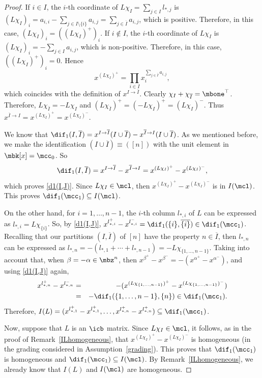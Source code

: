 \begin{proof}
If $i\in I$, the $i$-th coordinate of $L\chi_I=\sum_{j\in I}l_{*,j}$
is $(L\chi_I)_i=a_{i,i}-\sum_{j\in
  I\setminus\{i\}}a_{i,j}=\sum_{j\in\overline{I}}a_{i,j}$, which is
positive. Therefore, in this case, $(L\chi_I)_i=((L\chi_I)^+)_i$.  If
$i\not\in I$, the $i$-th coordinate of $L\chi_I$ is
$(L\chi_I)_i=-\sum_{j\in I}a_{i,j}$, which is non-positive. Therefore,
in this case, $((L\chi_I)^+)_i=0$. Hence
\[
x^{(L\chi_I)^{+}}=\prod_{i\in
  I}x_i^{\sum_{j\in\overline{I}}a_{i,j}},
\]
which coincides with the
definition of $x^{I\to\overline{I}}$. Clearly
$\chi_I+\chi_{\overline{I}}=\mbone^{\top}$. Therefore,
$L\chi_{\overline{I}}=-L\chi_I$ and
$(L\chi_{\overline{I}})^+=(-L\chi_I)^+=(L\chi_I)^-$. Thus
$x^{\overline{I}\to I}=x^{(L\chi_{\overline{I}})^+}=x^{(L\chi_I)^-}$.

We know that $\dif_1(I,\overline{I})=x^{I\to \overline{I}}(I\cup
\overline{I})-x^{\overline{I}\to I}(I\cup \overline{I})$. As we
mentioned before, we make the identification $(I\cup
\overline{I})\equiv ([n])$ with the unit element in $\mbk[x]=\mcc_0$. So
\begin{eqnarray*}
\dif_1(I,\overline{I})=x^{I\to \overline{I}}-x^{\overline{I}\to
  I}=x^{(L\chi_I)^+}-x^{(L\chi_I)^-}, 
\end{eqnarray*}
which proves \eqref{d1(I,J)}. Since $L\chi_I\in\mcl$, then
$x^{(L\chi_I)^+}-x^{(L\chi_I)^-}$ is in $I(\mcl)$. This proves
$\dif_1(\mcc_1)\subseteq I(\mcl)$.

On the other hand, for $i=1,\ldots, n-1$, the $i$-th column $l_{*,i}$
of $L$ can be expressed as $l_{*,i}=L\chi_{\{i\}}$.  So, by
\eqref{d1(I,J)},
$x^{l_{*,i}^+}-x^{l_{*,i}^-}=\dif_1(\{i\},\overline{\{i\}})\in
\dif_1(\mcc_1)$.  Recalling that our partitions $(I,\overline{I})$ of
$[n]$ have the property $n\in \overline{I}$, then $l_{*,n}$ can be
expressed as $l_{*,n}=-(l_{*,1}+\cdots +l_{*,n-1})=-L\chi_{\{1,\ldots
  ,n-1\}}$. Taking into account that, when $\beta=-\alpha\in\mbz^n$,
then $x^{\beta^+}-x^{\beta^-}=-(x^{\alpha^+}-x^{\alpha^-})$, and using
\eqref{d1(I,J)} again,
\begin{eqnarray*}
x^{l_{*,n}^+}-x^{l_{*,n}^-} & = &
  -(x^{(L\chi_{\{1,\ldots,n-1\}})^+}-x^{(L\chi_{\{1,\ldots
      ,n-1\}})^-})\\ &=& -\dif_1(\{1,\ldots ,n-1\},\{n\})\in
  \dif_1(\mcc_1).
\end{eqnarray*}
Therefore, $I(L)=(x^{l_{*,1}^+}-x^{l_{*,1}^+},\ldots
,x^{l_{*,n}^+}-x^{l_{*,n}^+})\subseteq \dif_1(\mcc_1)$.

Now, suppose that $L$ is an $\icb$ matrix. Since $L\chi_I\in\mcl$, it
follows, as in the proof of Remark~\ref{ILhomogeneous}, that
$x^{(L\chi_I)^+}-x^{(L\chi_I)^-}$ is homogeneous (in the grading
considered in Assumption~\ref{grading}). This proves that
$\dif_1(\mcc_1)$ is homogeneous and $\dif_1(\mcc_1)\subseteq
I(\mcl)$. By Remark~\ref{ILhomogeneous}, we already know that $I(L)$
and $I(\mcl)$ are homogeneous.
\end{proof}

